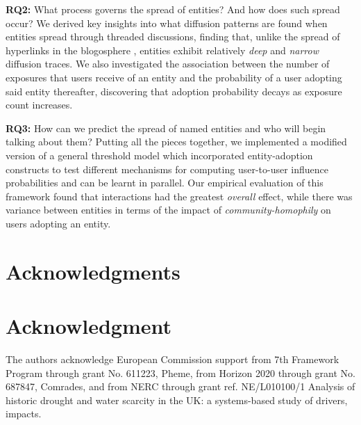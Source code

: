 \documentclass[10pt,journal,compsoc]{IEEEtran}
\begin{document}
 \textbf{RQ2:} What process governs the spread of entities? And how does such spread occur?
We derived key insights into what diffusion patterns are found when entities spread through threaded discussions,  finding that, unlike the spread of hyperlinks in the blogosphere \cite{leskovec2007patterns}, entities exhibit relatively \emph{deep} and \emph{narrow} diffusion traces.
We also investigated the association between the number of exposures that users receive of an entity and the probability of a user adopting said entity thereafter, discovering that adoption probability decays as exposure count increases.

 \textbf{RQ3:} How can we predict the spread of named entities and who will begin talking about them?	
Putting all the pieces together, we implemented a modified version of a general threshold model which incorporated entity-adoption constructs to test different mechanisms for computing user-to-user influence probabilities and can be learnt in parallel.
Our empirical evaluation of this framework found that interactions had the greatest \emph{overall} effect, while there was variance between entities in terms of the impact of \emph{community-homophily} on users adopting an entity.

\ifCLASSOPTIONcompsoc
  \section*{Acknowledgments}
\else
  \section*{Acknowledgment}
\fi
The authors acknowledge European Commission support from 7th Framework Program through grant No. 611223, {\sc Pheme}, from Horizon 2020 through grant No. 687847, Comrades, and from NERC through grant ref. NE/L010100/1 Analysis of historic drought and water scarcity in the UK: a systems-based study of drivers, impacts.




\end{document}
